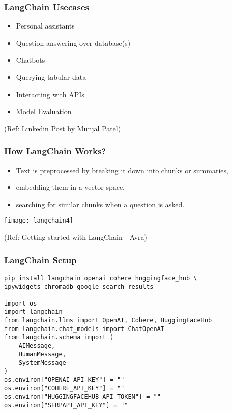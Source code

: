 \begin{frame}\frametitle{LangChain Usecases}

\begin{itemize}
\item Personal assistants
\item Question answering over database(s)
\item Chatbots
\item Querying tabular data
\item Interacting with APIs
\item Model Evaluation
\end{itemize}


{\tiny (Ref: Linkedin Post by Munjal Patel)}
\end{frame}


\begin{frame}\frametitle{How LangChain Works?}

\begin{itemize}
\item Text is preprocessed by breaking it down into chunks or summaries, 
\item embedding them in a vector space, 
\item searching for similar chunks when a question is asked. 
\end{itemize}

\begin{center}
\texttt{[image: langchain4]}
\end{center}	  


{\tiny (Ref: Getting started with LangChain - Avra)}
\end{frame}

\begin{frame}[fragile]\frametitle{LangChain Setup}

\begin{lstlisting}
pip install langchain openai cohere huggingface_hub \
ipywidgets chromadb google-search-results

import os
import langchain
from langchain.llms import OpenAI, Cohere, HuggingFaceHub
from langchain.chat_models import ChatOpenAI
from langchain.schema import (
    AIMessage,
    HumanMessage,
    SystemMessage
)
os.environ["OPENAI_API_KEY"] = ""
os.environ["COHERE_API_KEY"] = ""
os.environ["HUGGINGFACEHUB_API_TOKEN"] = ""
os.environ["SERPAPI_API_KEY"] = ""
\end{lstlisting}	  

\end{frame}

